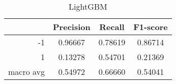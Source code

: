 \begin{table}[!h]
    \centering
    \renewcommand{\arraystretch}{1.5}
    \begin{tabular}{|r|c|c|c|}
        \hline
                  & Precision & Recall & F1-score \\ \hline
        -1        &     0.96667     &     0.78619   &    0.86714      \\ \hline
        1         &     0.13278      &     0.54701   &   0.21369       \\ \hline
        macro avg &      0.54972     &     0.66660   &    0.54041      \\ \hline
    \end{tabular}
    \caption{LightGBM}
\end{table}
